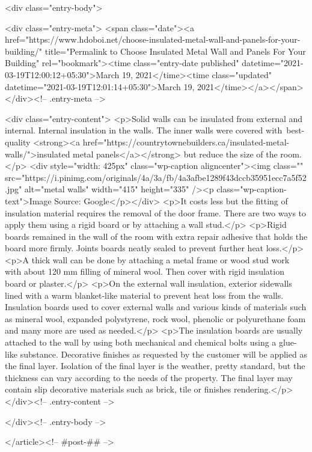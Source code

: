 	<div class="entry-body">

				<div class="entry-meta">
			<span class="date"><a href="https://www.hdoboi.net/choose-insulated-metal-wall-and-panels-for-your-building/" title="Permalink to Choose Insulated Metal Wall and Panels For Your Building" rel="bookmark"><time class="entry-date published" datetime="2021-03-19T12:00:12+05:30">March 19, 2021</time><time class="updated" datetime="2021-03-19T12:01:14+05:30">March 19, 2021</time></a></span>		</div><!-- .entry-meta -->
		
				<div class="entry-content">
			<p>Solid walls can be insulated from external and internal. Internal insulation in the walls. The inner walls were covered with best-quality <strong><a href="https://countrytownebuilders.ca/insulated-metal-walls/">insulated metal panels</a></strong> but reduce the size of the room.</p>
<div style="width: 425px" class="wp-caption aligncenter"><img class="" src="https://i.pinimg.com/originals/4a/3a/fb/4a3afbe1289f43dccb35951ecc7a5f52.jpg" alt="metal walls" width="415" height="335" /><p class="wp-caption-text">Image Source: Google</p></div>
<p>It costs less but the fitting of insulation material requires the removal of the door frame. There are two ways to apply them using a rigid board or by attaching a wall stud.</p>
<p>Rigid boards remained in the wall of the room with extra repair adhesive that holds the board more firmly. Joints boards neatly sealed to prevent further heat loss.</p>
<p>A thick wall can be done by attaching a metal frame or wood stud work with about 120 mm filling of mineral wool. Then cover with rigid insulation board or plaster.</p>
<p>On the external wall insulation, exterior sidewalls lined with a warm blanket-like material to prevent heat loss from the walls. Insulation boards used to cover external walls and various kinds of materials such as mineral wool, expanded polystyrene, rock wool, phenolic or polyurethane foam and many more are used as needed.</p>
<p>The insulation boards are usually attached to the wall by using both mechanical and chemical bolts using a glue-like substance. Decorative finishes as requested by the customer will be applied as the final layer. Isolation of the final layer is the weather, pretty standard, but the thickness can vary according to the needs of the property. The final layer may contain slip decorative materials such as brick, tile or finishes rendering.</p>
					</div><!-- .entry-content -->
		
		
			</div><!-- .entry-body -->

</article><!-- #post-## -->

